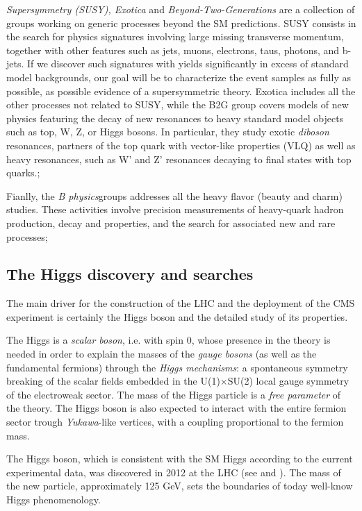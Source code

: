 \begin{outline}
    \1 \emph{Supersymmetry (SUSY), Exotica} and \emph{Beyond-Two-Generations} are a collection of groups working on generic processes beyond the SM predictions. SUSY consists in the search for physics signatures involving large missing transverse momentum, together with other features such as jets, muons, electrons, taus, photons, and b-jets. If we discover such signatures with yields significantly in excess of standard model backgrounds, our goal will be to characterize the event samples as fully as possible, as possible evidence of a supersymmetric theory. Exotica includes all the other processes not related to SUSY, while the B2G group covers models of new physics featuring the decay of new resonances to heavy standard model objects such as top, W, Z, or Higgs bosons. In particular, they study exotic \emph{diboson} resonances, partners of the top quark with vector-like properties (VLQ) as well as heavy resonances, such as W' and Z' resonances decaying to final states with top quarks.;
    
    \1 Fianlly, the \emph{B physics}groups addresses all the heavy flavor (beauty and charm) studies. These activities involve precision measurements of heavy-quark hadron production, decay and properties, and the search for associated new and rare processes;
    
\end{outline}

\subsection{The Higgs discovery and searches}

The main driver for the construction of the LHC and the deployment of the CMS experiment is certainly the Higgs boson and the detailed study of its properties. 

The Higgs is a \emph{scalar boson}, i.e. with spin $0$, whose presence in the theory is needed in order to explain the masses of the \emph{gauge bosons} (as well as the fundamental fermions) through the \emph{Higgs mechanisms}: a spontaneous symmetry breaking of the scalar fields embedded in the U(1)$\times$SU(2) local gauge symmetry of the electroweak sector. The mass of the Higgs particle is a \emph{free parameter} of the theory. The Higgs boson is also expected to  interact with the entire fermion sector trough \emph{Yukawa}-like vertices, with a coupling proportional to the fermion mass.

The Higgs boson, which is consistent with the SM Higgs according to the current experimental data, was discovered in 2012 at the LHC (see \cite{Aad_2012} and \cite{Chatrchyan_2012}). The mass of the new particle, approximately 125 GeV, sets the boundaries of today well-know Higgs phenomenology.

